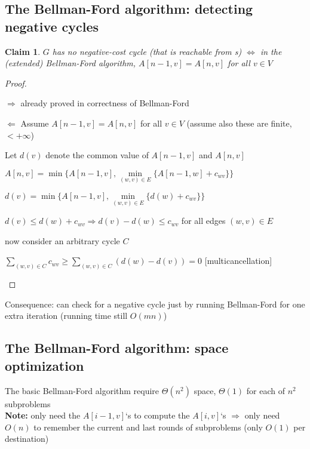 \documentclass[a4paper,12pt]{article}
\theoremstyle{plain}
\newtheorem{claim}{Claim}
\theoremstyle{definition}
\theoremstyle{remark}
\begin{document}
\subsection{The Bellman-Ford algorithm: detecting negative cycles}
\begin{claim} $G$ has no negative-cost cycle (that is reachable from s) $\iff$ in the (extended) Bellman-Ford algorithm, $A[n-1, v] = A[n, v]$ for all $v \in V$\end{claim}
\begin{proof}
\begin{description}
	\item{$\Rightarrow$} already proved in correctness of Bellman-Ford
	\item{$\Leftarrow$} Assume $A[n-1, v] = A[n, v]$ for all $v \in V$ (assume also these are finite, $< +\infty$)

	Let $d(v)$ denote the common value of $A[n-1, v]$ and $A[n, v]$

	\begin{center}
	$A[n, v] = \min \{A[n-1, v], \min\limits_{(w,v) \in E} \{ A[n-1, w] + c_{wv} \}\}$

	$d(v) = \min \{A[n-1, v], \min\limits_{(w,v) \in E} \{ d(w) + c_{wv} \}\}$

	$d(v) \leq d(w) + c_{wv} \Rightarrow d(v) - d(w) \leq c_{wv}$ for all edges $(w, v) \in E$
	\end{center}

	now consider an arbitrary cycle $C$

	\begin{center}
		$\sum\limits_{(w,v) \in C} c_{wv} \geq \sum\limits_{(w,v) \in C} (d(w) - d(v)) = 0$ [multicancellation]
	\end{center}
\end{description}
\end{proof}

Consequence: can check for a negative cycle just by running Bellman-Ford for one extra iteration (running time still $O(mn)$)



\subsection{The Bellman-Ford algorithm: space optimization}
The basic Bellman-Ford algorithm require $\Theta(n^2)$ space, $\Theta(1)$ for each of $n^2$ subproblems
\\

\textbf{Note:} only need the $A[i-1, v]$`s to compute the $A[i, v]$`s $\Rightarrow$ only need $O(n)$ to remember the current and last rounds of subproblems (only $O(1)$ per destination)
\end{document}
